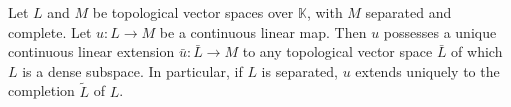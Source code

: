 Let $L$ and $M$ be topological vector spaces over $\mathbb{K}$, with $M$ separated and complete. Let $u: L \to M$ be a continuous linear map. Then $u$ possesses a unique continuous linear extension $\bar{u}: \bar{L} \to M$ to any topological vector space $\bar{L}$ of which $L$ is a dense subspace. In particular, if $L$ is separated, $u$ extends uniquely to the completion $\tilde{L}$ of $L$.
